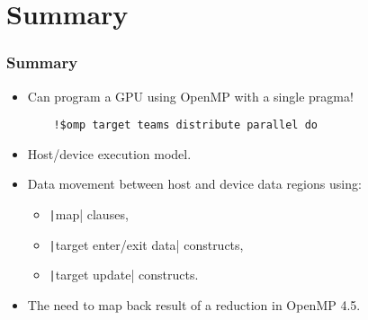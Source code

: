 \documentclass[aspectratio=169]{beamer}
\begin{document}
\section{Summary}
\begin{frame}[fragile]
\frametitle{Summary}
\begin{itemize}
  \item Can program a GPU using OpenMP with a single pragma!
    \begin{verbatim}
    !$omp target teams distribute parallel do
    \end{verbatim}

  \item Host/device execution model.

  \item Data movement between host and device data regions using:
    \begin{itemize}
      \item \texttt|map| clauses,
      \item \texttt|target enter/exit data| constructs,
      \item \texttt|target update| constructs.
    \end{itemize}

  \item The need to map back result of a reduction in OpenMP 4.5.

\end{itemize}
\end{frame}

\end{document}
